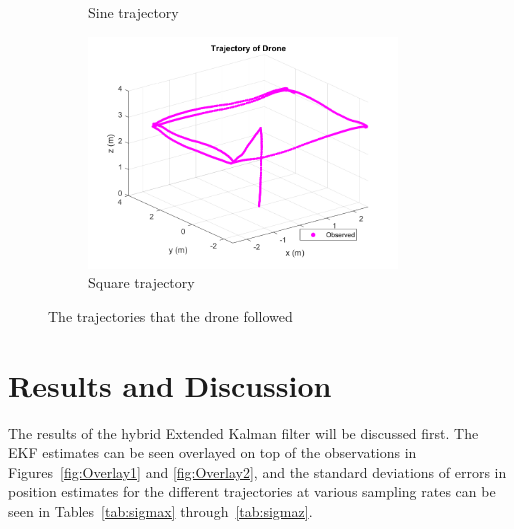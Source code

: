 \documentclass[letterpaper, paper,11pt]{AAS}	%
\begin{document}
\begin{figure}[H]
\begin{subfigure}{.4\textwidth}
	\caption{Sine trajectory}
	\label{fig:sine1_just_traj}
\end{subfigure}%
\begin{subfigure}{.4\textwidth}
	\centering
	\includegraphics[width=0.9\textwidth]{Figures/square1_just_traj}
	\caption{Square trajectory}
	\label{fig:square1_just_traj}
\end{subfigure}
\caption{The trajectories that the drone followed}
\label{fig:DroneTrajectories}
\end{figure}

\section{Results and Discussion}

The results of the hybrid Extended Kalman filter will be discussed first. The EKF estimates can be seen overlayed on top of the observations in Figures~\ref{fig:Overlay1} and \ref{fig:Overlay2}, and the standard deviations of errors in position estimates for the different trajectories at various sampling rates can be seen in Tables~\ref{tab:sigmax} through~\ref{tab:sigmaz}.
\end{document}
